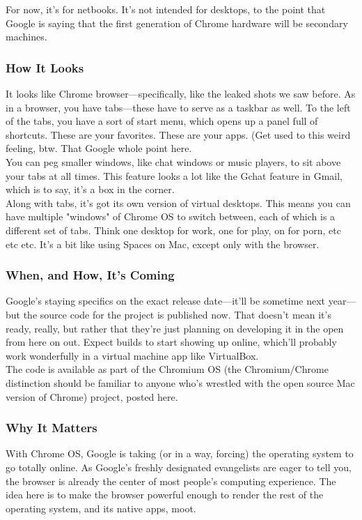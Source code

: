 \documentclass{article}
\begin{document}
	  For now, it's for netbooks. It's not intended for desktops, to the point that Google is saying that the first generation of Chrome hardware will be secondary machines.\\

	 \subsubsection{How It Looks}
	  It looks like Chrome browser—specifically, like the leaked shots we saw before. As in a browser, you have tabs—these have to serve as a taskbar as well. To the left of the tabs, you have a sort of start menu, which opens up a panel full of shortcuts. These are your favorites. These are your apps. (Get used to this weird feeling, btw. That Google whole point here.\\

			  You can peg smaller windows, like chat windows or music players, to sit above your tabs at all times. This feature looks a lot like the Gchat feature in Gmail, which is to say, it's a box in the corner.\\

			  Along with tabs, it's got its own version of virtual desktops. This means you can have multiple "windows" of Chrome OS to switch between, each of which is a different set of tabs. Think one desktop for work, one for play, on for porn, etc etc etc. It's a bit like using Spaces on Mac, except only with the browser.\\

			 \subsubsection{When, and How, It's Coming}
			  Google's staying specifics on the exact release date—it'll be sometime next year—but the source code for the project is published now. That doesn't mean it's ready, really, but rather that they're just planning on developing it in the open from here on out. Expect builds to start showing up online, which'll probably work wonderfully in a virtual machine app like VirtualBox.\\

			  The code is available as part of the Chromium OS (the Chromium/Chrome distinction should be familiar to anyone who's wrestled with the open source Mac version of Chrome) project, posted here.\\

			 \subsubsection{Why It Matters}
			  With Chrome OS, Google is taking (or in a way, forcing) the operating system to go totally online. As Google's freshly designated evangelists are eager to tell you, the browser is already the center of most people's computing experience. The idea here is to make the browser powerful enough to render the rest of the operating system, and its native apps, moot.\\
\end{document}
